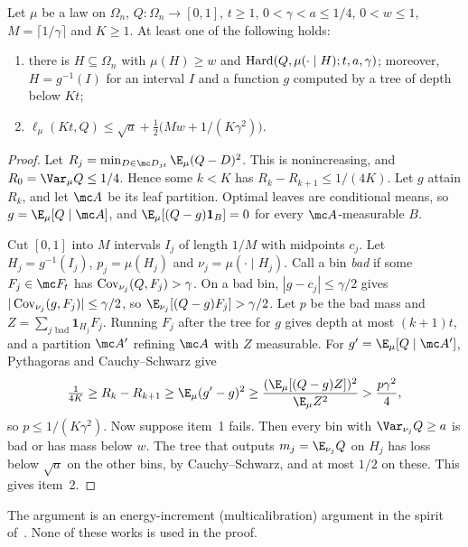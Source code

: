 \begin{theorem}\label{dist:regularity}
Let \(\mu\) be a law on \(\Omega_n\), \(Q:\Omega_n\to[0,1]\), \(t\ge1\),
\(0<\gamma<a\le1/4\), \(0<w\le1\), \(M=\lceil1/\gamma\rceil\) and \(K\ge1\). At
least one of the following holds:
\begin{enumerate}
\item there is \(H\subseteq\Omega_n\) with \(\mu(H)\ge w\) and
\(\operatorname{Hard}(Q,\mu(\cdot\mid H);t,a,\gamma)\); moreover, \(H=g^{-1}(I)\) for an
interval \(I\) and a function \(g\) computed by a tree of depth below \(Kt\);
\item \(\ell_\mu(Kt,Q)\le\sqrt a+\tfrac12\bigl(Mw+1/(K\gamma^2)\bigr)\).
\end{enumerate}
\end{theorem}
\begin{proof}
Let \(R_j=\min_{D\in\mc D_{jt}}\E_\mu(Q-D)^2\). This is nonincreasing, and
\(R_0=\Var_\mu Q\le1/4\). Hence some \(k<K\) has \(R_k-R_{k+1}\le1/(4K)\). Let
\(g\) attain \(R_k\), and let \(\mc A\) be its leaf partition. Optimal leaves
are conditional means, so \(g=\E_\mu[Q\mid\mc A]\), and
\(\E_\mu[(Q-g)\mathbf 1_B]=0\) for every \(\mc A\)-measurable \(B\).

Cut \([0,1]\) into \(M\) intervals \(I_j\) of length \(1/M\) with midpoints
\(c_j\). Let \(H_j=g^{-1}(I_j)\), \(p_j=\mu(H_j)\) and
\(\nu_j=\mu(\cdot\mid H_j)\). Call a bin \emph{bad} if some
\(F_j\in\mc F_t\) has \(\operatorname{Cov}_{\nu_j}(Q,F_j)>\gamma\). On a bad bin,
\(|g-c_j|\le\gamma/2\) gives \(|\operatorname{Cov}_{\nu_j}(g,F_j)|\le\gamma/2\), so
\(\E_{\nu_j}[(Q-g)F_j]>\gamma/2\). Let \(p\) be the bad mass and
\(Z=\sum_{j\text{ bad}}\mathbf 1_{H_j}F_j\). Running \(F_j\) after the tree for
\(g\) gives depth at most \((k+1)t\), and a partition \(\mc A'\) refining \(\mc A\)
with \(Z\) measurable. For \(g'=\E_\mu[Q\mid\mc A']\), Pythagoras and
Cauchy--Schwarz give
\[
 \tfrac1{4K}\ge R_k-R_{k+1}\ge\E_\mu(g'-g)^2
 \ge\frac{(\E_\mu[(Q-g)Z])^2}{\E_\mu Z^2}>\frac{p\gamma^2}{4},
\]
so \(p\le1/(K\gamma^2)\). Now suppose item~1 fails. Then every bin with
\(\Var_{\nu_j}Q\ge a\) is bad or has mass below \(w\). The tree that outputs
\(m_j=\E_{\nu_j}Q\) on \(H_j\) has loss below \(\sqrt a\) on the other bins, by
Cauchy--Schwarz, and at most \(1/2\) on these. This gives item~2.
\end{proof}
The argument is an energy-increment (multicalibration) argument in the spirit
of~\cite{TTV09,HKRR18,CDV24}. None of these works is used in the proof.

